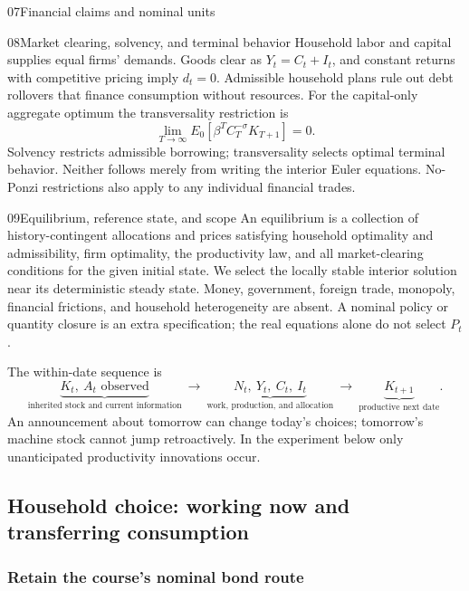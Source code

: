 \begin{modelsetup}[1]
\begin{modelcondition}{07}{Financial claims and nominal units}
\end{modelcondition}
\begin{modelcondition}{08}{Market clearing, solvency, and terminal behavior}
Household labor and capital supplies equal firms' demands. Goods clear as
$Y_t=C_t+I_t$, and constant returns with competitive pricing imply $d_t=0$.
Admissible household plans rule out debt rollovers that finance consumption
without resources. For the capital-only aggregate optimum the transversality
restriction is
\[
\lim_{T\to\infty}E_0[\beta^T C_T^{-\sigma}K_{T+1}]=0.
\]
Solvency restricts admissible borrowing; transversality selects optimal terminal
behavior. Neither follows merely from writing the interior Euler equations.
No-Ponzi restrictions also apply to any individual financial trades.
\end{modelcondition}
\begin{modelcondition}{09}{Equilibrium, reference state, and scope}
An equilibrium is a collection of history-contingent allocations and prices
satisfying household optimality and admissibility, firm optimality, the
productivity law, and all market-clearing conditions for the given initial
state. We select the locally stable interior solution near its deterministic
steady state. Money, government, foreign trade, monopoly, financial frictions,
and household heterogeneity are absent. A nominal policy or quantity closure
is an extra specification; the real equations alone do not select $P_t$.
\end{modelcondition}
\end{modelsetup}

The within-date sequence is
\[
\underbrace{K_t,\ A_t\text{ observed}}_{\text{inherited stock and current information}}
\ \longrightarrow\
\underbrace{N_t,\ Y_t,\ C_t,\ I_t}_{\text{work, production, and allocation}}
\ \longrightarrow\
\underbrace{K_{t+1}}_{\text{productive next date}}.
\]
An announcement about tomorrow can change today's choices; tomorrow's machine
stock cannot jump retroactively. In the experiment below only unanticipated
productivity innovations occur.

\subsection{Household choice: working now and transferring consumption}

\subsubsection{Retain the course's nominal bond route}

